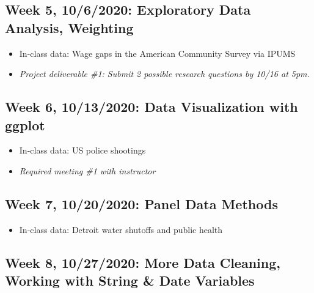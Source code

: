 \documentclass[11pt,]{article}
\providecommand{\tightlist}{%
  \setlength{\itemsep}{0pt}\setlength{\parskip}{0pt}}
\begin{document}
\hypertarget{week-5-1062020-exploratory-data-analysis-weighting}{%
\subsection{Week 5, 10/6/2020: Exploratory Data Analysis,
Weighting}\label{week-5-1062020-exploratory-data-analysis-weighting}}

\begin{itemize}
\tightlist
\item
  In-class data: Wage gaps in the American Community Survey via IPUMS
\item
  \emph{Project deliverable \#1: Submit 2 possible research questions by
  10/16 at 5pm.} \medskip
\end{itemize}

\hypertarget{week-6-10132020-data-visualization-with-ggplot}{%
\subsection{Week 6, 10/13/2020: Data Visualization with
ggplot}\label{week-6-10132020-data-visualization-with-ggplot}}

\begin{itemize}
\tightlist
\item
  In-class data: US police shootings
\item
  \emph{Required meeting \#1 with instructor} \medskip
\end{itemize}

\hypertarget{week-7-10202020-panel-data-methods}{%
\subsection{Week 7, 10/20/2020: Panel Data
Methods}\label{week-7-10202020-panel-data-methods}}

\begin{itemize}
\tightlist
\item
  In-class data: Detroit water shutoffs and public health \medskip
\end{itemize}

\hypertarget{week-8-10272020-more-data-cleaning-working-with-string-date-variables}{%
\subsection{Week 8, 10/27/2020: More Data Cleaning, Working with String
\& Date
Variables}\label{week-8-10272020-more-data-cleaning-working-with-string-date-variables}}
\end{document}

